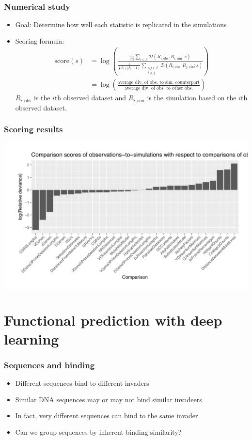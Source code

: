 \documentclass[mathserif,compress]{beamer}
\newcommand*\ba{\[ \begin{aligned}}
\newcommand*\ea{\end{aligned} \]}
\renewcommand\;{\,}
\begin{document}
\begin{frame}\frametitle{Numerical study }
\begin{itemize}
\item
Goal: Determine how well each statistic is replicated in the simulations
\bigskip
\item
Scoring formula:
\ba
\text{score}(s) & =
\log \left( \frac{ \frac{1}{|\mathcal I|} \sum_{i \in \mathcal I} \mathcal D \left( R_{i, \text{obs}}, R_{i, \text{sim}} ; s\right) }
    { \frac{1}{\frac{1}{2} |\mathcal I|\left(|\mathcal I| - 1\right)}
        \sum_{\substack{i, j \in \mathcal I \\ i \ne j}} \mathcal D\left(R_{i, \text{obs}}, R_{j, \text{obs}}; s\right) } \right) \\
	& = \log \left( \frac{ \text{average div. of obs. to sim. counterpart} }
					{ \text{average div. of obs. to other obs.} } \right)
\ea 
$R_{i, \text{obs}}$ is the $i$th observed dataset and $R_{i, \text{sim}}$ is the simulation based on the $i$th observed dataset.  
\bigskip
\end{itemize}
\end{frame}

\begin{frame}\frametitle{Scoring results}
\begin{center}
\includegraphics[width=\linewidth]{Images/score_plot.pdf}
\end{center}
\end{frame}

\section{Functional prediction with deep learning}

\begin{frame}\frametitle{Sequences and binding}
\begin{itemize}
\item
Different sequences bind to different invaders
\bigskip
\item
Similar DNA sequences may or may not bind similar invadeers
\item
\bigskip
In fact, very different sequences can bind to the same invader
\bigskip
\item
Can we group sequences by inherent binding similarity?
\end{itemize}
\end{frame}
\end{document}
